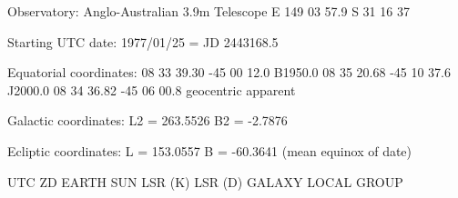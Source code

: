 \documentclass[11pt,noabs,nolof]{starlink}
\newenvironment{verysmall}{\begin{scriptsize}}{\end{scriptsize}}
\begin{document}
\begin{verysmall}
\begin{terminalv}
Observatory:   Anglo-Australian 3.9m Telescope
              E 149 03 57.9   S 31 16 37

Starting UTC date:   1977/01/25  =  JD 2443168.5

Equatorial coordinates:   08 33 39.30  -45 00 12.0   B1950.0
                         08 35 20.68  -45 10 37.6   J2000.0
                         08 34 36.82  -45 06 00.8   geocentric apparent

Galactic coordinates:   L2 = 263.5526  B2 =  -2.7876

Ecliptic coordinates:   L  = 153.0557  B  = -60.3641  (mean equinox of date)


     UTC            ZD     EARTH         SUN            LSR (K)   LSR (D)     GALAXY    LOCAL GROUP


\end{terminalv}
\end{verysmall}
\end{document}
